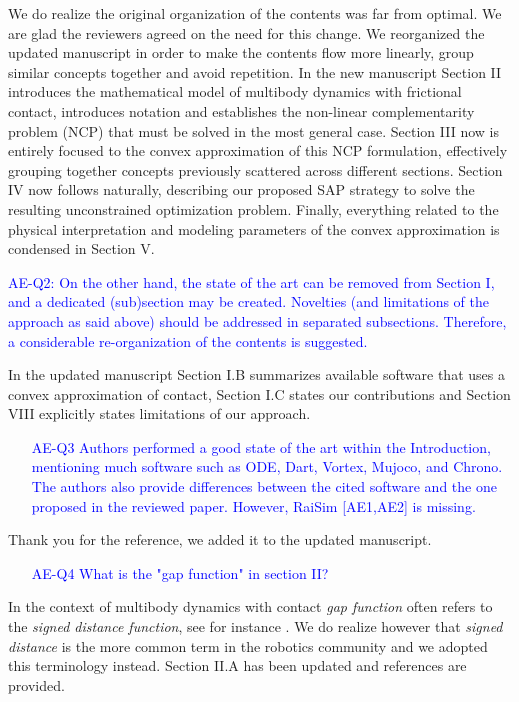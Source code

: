 We do realize the original organization of the contents was far from optimal. We
are glad the reviewers agreed on the need for this change. We reorganized the
updated manuscript in order to make the contents flow more linearly, group
similar concepts together and avoid repetition. In the new manuscript Section II
introduces the mathematical model of multibody dynamics with frictional contact,
introduces notation and establishes the non-linear complementarity problem (NCP)
that must be solved in the most general case. Section III now is entirely
focused to the convex approximation of this NCP formulation, effectively
grouping together concepts previously scattered across different sections.
Section IV now follows naturally, describing our proposed SAP strategy to solve
the resulting unconstrained optimization problem. Finally, everything related to
the physical interpretation and modeling parameters of the convex approximation
is condensed in Section V.

\vspace{5mm}
\textcolor{blue}{AE-Q2: On the other hand, the state of the art can be removed from
Section I, and a dedicated (sub)section may be created. Novelties (and
limitations of the approach as said above) should be addressed in separated
subsections. Therefore, a considerable re-organization of the contents is
suggested.}

In the updated manuscript Section I.B summarizes available software that uses a
convex approximation of contact, Section I.C states our contributions and
Section VIII explicitly states limitations of our approach.

\textcolor{blue}{
\begin{itemize}
    \item[AE-Q3] Authors performed a good state of the art within the Introduction,
    mentioning much software such as ODE, Dart, Vortex, Mujoco, and Chrono. The
    authors also provide differences between the cited software and the one
    proposed in the reviewed paper. However, RaiSim [AE1,AE2] is
    missing.\end{itemize}}

Thank you for the reference, we added it to the updated manuscript.

\textcolor{blue}{
\begin{itemize}
    \item[AE-Q4] What is the "gap function" in section II?\end{itemize}}
    
In the context of multibody dynamics with contact \emph{gap function} often
refers to the \emph{signed distance function}, see for instance
\cite{bib:negrut2018posing}. We do realize however that \emph{signed distance}
is the more common term in the robotics community and we adopted this
terminology instead. Section II.A has been updated and references are provided.

